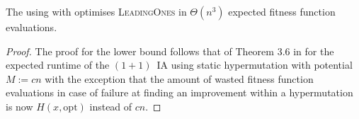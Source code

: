 \documentclass[lettersize,journal]{IEEEtran}
\begin{document}
\begin{theorem} \label{th:linHD-LO}
The {\oneoneIA } using \IPHfcm{} with {\linHD } optimises \textsc{LeadingOnes} in $\Theta(n^3)$ expected fitness function evaluations.
\end{theorem}

\begin{proof}

The proof for the lower bound follows that of Theorem 3.6 in \cite{CorusOlivetoYazdaniGECCO2017} for the expected runtime of the $(1+1)$~IA %
using static hypermutation with potential $M:=cn$ with the exception that the amount of wasted fitness function evaluations in case of failure at finding an improvement within a hypermutation is now $H(x,\text{opt})$ instead of $cn$.



\end{proof}
\end{document}
